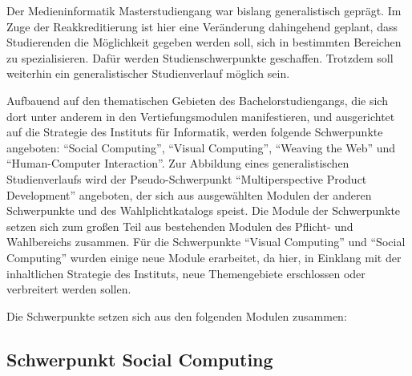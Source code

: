 Der Medieninformatik Masterstudiengang war bislang generalistisch
geprägt. Im Zuge der Reakkreditierung ist hier eine Veränderung
dahingehend geplant, dass Studierenden die Möglichkeit gegeben werden
soll, sich in bestimmten Bereichen zu spezialisieren. Dafür werden
Studienschwerpunkte geschaffen. Trotzdem soll weiterhin ein
generalistischer Studienverlauf möglich sein.

Aufbauend auf den thematischen Gebieten des Bachelorstudiengangs, die
sich dort unter anderem in den Vertiefungsmodulen manifestieren, und
ausgerichtet auf die Strategie des Instituts für Informatik, werden
folgende Schwerpunkte angeboten: ``Social Computing'', ``Visual
Computing'', ``Weaving the Web'' und ``Human-Computer Interaction''. Zur
Abbildung eines generalistischen Studienverlaufs wird der
Pseudo-Schwerpunkt ``Multiperspective Product Development'' angeboten,
der sich aus ausgewählten Modulen der anderen Schwerpunkte und des
Wahlplichtkatalogs speist. Die Module der Schwerpunkte setzen sich zum
großen Teil aus bestehenden Modulen des Pflicht- und Wahlbereichs
zusammen. Für die Schwerpunkte ``Visual Computing'' und ``Social
Computing'' wurden einige neue Module erarbeitet, da hier, in Einklang
mit der inhaltlichen Strategie des Instituts, neue Themengebiete
erschlossen oder verbreitert werden sollen.

Die Schwerpunkte setzen sich aus den folgenden Modulen zusammen:

\subsection{Schwerpunkt Social
Computing}\label{schwerpunkt-social-computing}

